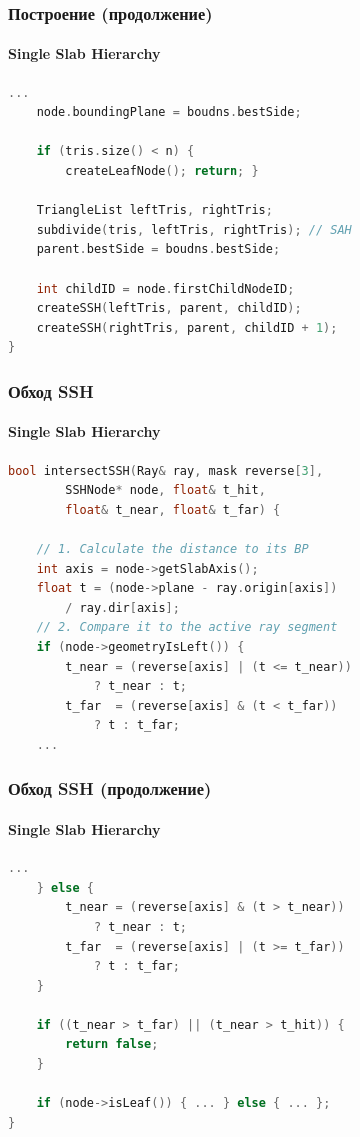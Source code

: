 \documentclass{beamer}
\begin{document}
\begin{frame}[fragile]
    \frametitle{Построение (продолжение)}
    \framesubtitle{Single Slab Hierarchy}
    \begin{lstlisting}[language=C++,basicstyle=\ttfamily,keywordstyle=\color{blue}]
    ...
    node.boundingPlane = boudns.bestSide;

    if (tris.size() < n) {
        createLeafNode(); return; }

    TriangleList leftTris, rightTris;
    subdivide(tris, leftTris, rightTris); // SAH
    parent.bestSide = boudns.bestSide;

    int childID = node.firstChildNodeID;
    createSSH(leftTris, parent, childID);
    createSSH(rightTris, parent, childID + 1);
}
    \end{lstlisting}
\end{frame}

\begin{frame}[fragile]
    \frametitle{Обход SSH}
    \framesubtitle{Single Slab Hierarchy}
    \begin{lstlisting}[language=C++,basicstyle=\ttfamily,keywordstyle=\color{blue}]
bool intersectSSH(Ray& ray, mask reverse[3],
        SSHNode* node, float& t_hit,
        float& t_near, float& t_far) {

    // 1. Calculate the distance to its BP
    int axis = node->getSlabAxis();
    float t = (node->plane - ray.origin[axis])
        / ray.dir[axis];
    // 2. Compare it to the active ray segment
    if (node->geometryIsLeft()) {
        t_near = (reverse[axis] | (t <= t_near))
            ? t_near : t;
        t_far  = (reverse[axis] & (t < t_far))
            ? t : t_far;
    ...

    \end{lstlisting}
\end{frame}

\begin{frame}[fragile]
    \frametitle{Обход SSH (продолжение)}
    \framesubtitle{Single Slab Hierarchy}

    \begin{lstlisting}[language=C++,basicstyle=\ttfamily,keywordstyle=\color{blue}]
    ...
    } else {
        t_near = (reverse[axis] & (t > t_near))
            ? t_near : t;
        t_far  = (reverse[axis] | (t >= t_far))
            ? t : t_far;
    }

    if ((t_near > t_far) || (t_near > t_hit)) {
        return false;
    }

    if (node->isLeaf()) { ... } else { ... };
}
    \end{lstlisting}
\end{frame}
\end{document}
